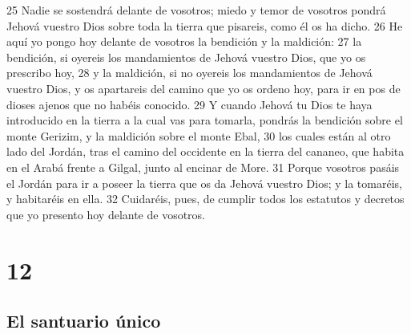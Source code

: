 25 Nadie se sostendrá delante de vosotros; miedo y temor de vosotros pondrá Jehová vuestro Dios sobre toda la tierra que pisareis, como él os ha dicho.
26 He aquí yo pongo hoy delante de vosotros la bendición y la maldición:
27 la bendición, si oyereis los mandamientos de Jehová vuestro Dios, que yo os prescribo hoy,
28 y la maldición, si no oyereis los mandamientos de Jehová vuestro Dios, y os apartareis del camino que yo os ordeno hoy, para ir en pos de dioses ajenos que no habéis conocido.
29 Y cuando Jehová tu Dios te haya introducido en la tierra a la cual vas para tomarla, pondrás la bendición sobre el monte Gerizim, y la maldición sobre el monte Ebal,
30 los cuales están al otro lado del Jordán, tras el camino del occidente en la tierra del cananeo, que habita en el Arabá frente a Gilgal, junto al encinar de More.
31 Porque vosotros pasáis el Jordán para ir a poseer la tierra que os da Jehová vuestro Dios; y la tomaréis, y habitaréis en ella.
32 Cuidaréis, pues, de cumplir todos los estatutos y decretos que yo presento hoy delante de vosotros.

\chapter{12}

\section{El santuario único}

